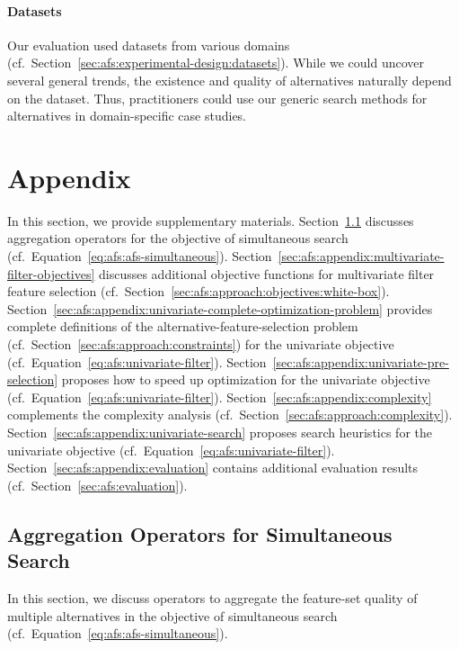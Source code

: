 \documentclass{article}
\theoremstyle{definition}
\begin{document}
\paragraph{Datasets}

Our evaluation used datasets from various domains (cf.~Section~\ref{sec:afs:experimental-design:datasets}).
While we could uncover several general trends, the existence and quality of alternatives naturally depend on the dataset.
Thus, practitioners could use our generic search methods for alternatives in domain-specific case studies.

\appendix

\section{Appendix}
\label{sec:afs:appendix}

In this section, we provide supplementary materials.
Section~\ref{sec:afs:appendix:simultaneous-objective-aggregation} discusses aggregation operators for the objective of simultaneous search (cf.~Equation~\ref{eq:afs:afs-simultaneous}).
Section~\ref{sec:afs:appendix:multivariate-filter-objectives} discusses additional objective functions for multivariate filter feature selection (cf.~Section~\ref{sec:afs:approach:objectives:white-box}).
Section~\ref{sec:afs:appendix:univariate-complete-optimization-problem} provides complete definitions of the alternative-feature-selection problem (cf.~Section~\ref{sec:afs:approach:constraints}) for the univariate objective (cf.~Equation~\ref{eq:afs:univariate-filter}).
Section~\ref{sec:afs:appendix:univariate-pre-selection} proposes how to speed up optimization for the univariate objective (cf.~Equation~\ref{eq:afs:univariate-filter}).
Section~\ref{sec:afs:appendix:complexity} complements the complexity analysis (cf.~Section~\ref{sec:afs:approach:complexity}).
Section~\ref{sec:afs:appendix:univariate-search} proposes search heuristics for the univariate objective (cf.~Equation~\ref{eq:afs:univariate-filter}).
Section~\ref{sec:afs:appendix:evaluation} contains additional evaluation results (cf.~Section~\ref{sec:afs:evaluation}).

\subsection{Aggregation Operators for Simultaneous Search}
\label{sec:afs:appendix:simultaneous-objective-aggregation}

In this section, we discuss operators to aggregate the feature-set quality of multiple alternatives in the objective of simultaneous search (cf.~Equation~\ref{eq:afs:afs-simultaneous}).
\end{document}
